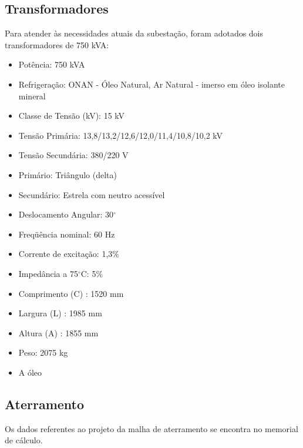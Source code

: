\subsection{Transformadores}
Para atender às necessidades atuais da subestação, foram adotados dois transformadores de 750 kVA:

\begin{itemize}
\item Potência: 750 kVA
\item Refrigeração: ONAN - Óleo Natural, Ar Natural - imerso em óleo isolante mineral
\item Classe de Tensão (kV): 15 kV
\item Tensão Primária: 13,8/13,2/12,6/12,0/11,4/10,8/10,2 kV
\item Tensão Secundária: 380/220 V
\item Primário: Triângulo (delta)
\item Secundário: Estrela com neutro acessível
\item Deslocamento Angular: 30$^{\circ}$
\item Freqüência nominal: 60 Hz
\item Corrente de excitação: 1,3$\%$
\item Impedância a 75$^{\circ}\mathrm{C}$: 5$\%$
\item Comprimento (C) : 1520 mm
\item Largura (L) : 1985 mm
\item Altura (A) : 1855 mm
\item Peso: 2075 kg
\item A óleo
\end{itemize}


\subsection{Aterramento} %
Os dados referentes ao projeto da malha de aterramento se encontra no memorial de cálculo.
